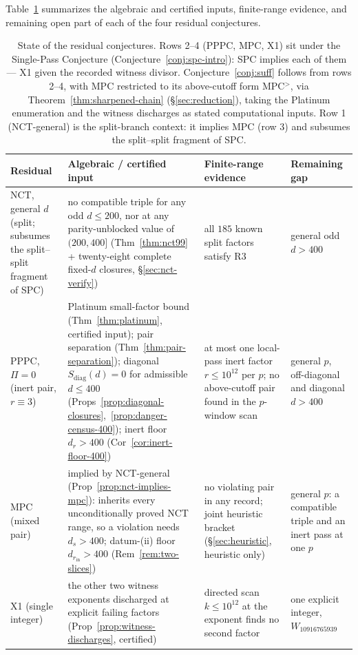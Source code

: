 \documentclass[11pt]{amsart}
\theoremstyle{plain}
\theoremstyle{definition}
\theoremstyle{remark}
\numberwithin{equation}{section}
\begin{document}
Table~\ref{tab:status} summarizes the algebraic and certified inputs, finite-range evidence, and remaining open part of each of the four residual conjectures.

\begin{table}[ht]
\centering
\footnotesize
\renewcommand{\arraystretch}{1.25}
\begin{tabular}{@{}p{2.45cm}p{3.05cm}p{4.15cm}p{2.2cm}@{}}
\hline
Residual & Algebraic / certified input & Finite-range evidence & Remaining gap \\
\hline
NCT, general $d$ \newline (split; subsumes the split--split fragment of SPC) & no compatible triple for any odd $d \leq 200$, nor at any parity-unblocked value of $(200, 400]$ (Thm~\ref{thm:nct99} + twenty-eight complete fixed-$d$ closures, \S\ref{sec:nct-verify}) & all $185$ known split factors satisfy R3 & general odd $d > 400$ \\
PPPC, $\Pi = 0$ \newline (inert pair, $r \equiv 3$) & Platinum small-factor bound (Thm~\ref{thm:platinum}, certified input); pair separation (Thm~\ref{thm:pair-separation}); diagonal $S_{\mathrm{diag}}(d) = 0$ for admissible $d \leq 400$ (Props~\ref{prop:diagonal-closures},~\ref{prop:danger-census-400}); inert floor $d_r > 400$ (Cor~\ref{cor:inert-floor-400}) & at most one local-pass inert factor $r \leq 10^{12}$ per $p$; no above-cutoff pair found in the $p$-window scan & general $p$, off-diagonal and diagonal $d > 400$ \\
MPC \newline (mixed pair) & implied by NCT-general (Prop~\ref{prop:nct-implies-mpc}): inherits every unconditionally proved NCT range, so a violation needs $d_s > 400$; datum-(ii) floor $d_{r_{\mathrm{in}}} > 400$ (Rem~\ref{rem:two-slices}) & no violating pair in any record; joint heuristic bracket (\S\ref{sec:heuristic}, heuristic only) & general $p$: a compatible triple and an inert pass at one $p$ \\
X1 \newline (single integer) & the other two witness exponents discharged at explicit failing factors (Prop~\ref{prop:witness-discharges}, certified) & directed scan $k \leq 10^{12}$ at the exponent finds no second factor & one explicit integer, $W_{10916765939}$ \\
\hline
\end{tabular}
\caption{State of the residual conjectures. Rows 2--4 (PPPC, MPC, X1) sit under the Single-Pass Conjecture (Conjecture~\ref{conj:spc-intro}): SPC implies each of them --- X1 given the recorded witness divisor. Conjecture~\ref{conj:suff} follows from rows 2--4, with MPC restricted to its above-cutoff form MPC$^{>}$, via Theorem~\ref{thm:sharpened-chain} (\S\ref{sec:reduction}), taking the Platinum enumeration and the witness discharges as stated computational inputs. Row 1 (NCT-general) is the split-branch context: it implies MPC (row 3) and subsumes the split--split fragment of SPC.}
\label{tab:status}
\end{table}
\end{document}
